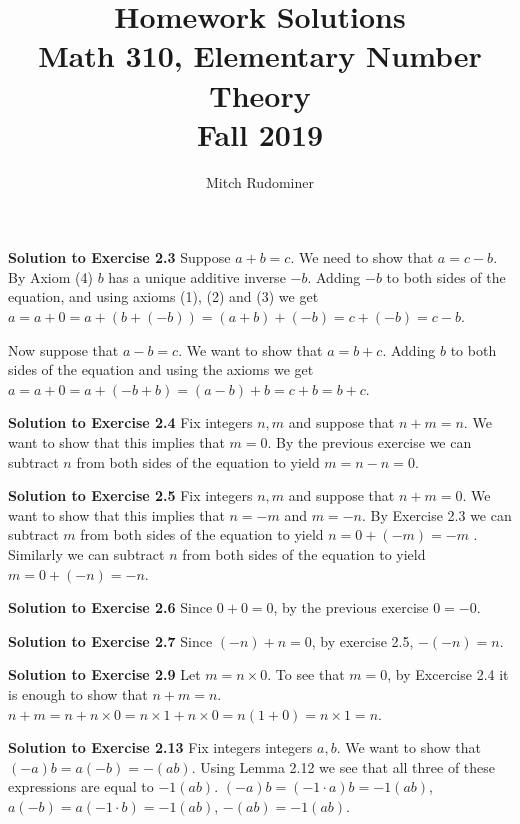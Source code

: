 \documentclass[oneside,12pt]{amsart}
\begin{document}
\title{Homework Solutions \\ Math 310, Elementary Number Theory \\ Fall 2019}
\author{Mitch Rudominer}

\maketitle

\textbf{Solution to Exercise 2.3} Suppose $a+b = c$. We need to show that $a=c-b$.
By Axiom (4) $b$ has a unique additive inverse $-b$. Adding $-b$
to both sides of the equation, and
using axioms (1), (2) and (3) we get
$a= a+0 = a + (b + (-b)) = (a+b) + (-b) = c + (-b) = c-b$.

Now suppose that $a-b = c$. We want to show that $a=b+c$.
Adding $b$ to both sides of the equation and using
the axioms we get
$a = a + 0 = a + (-b + b) = (a - b) +b  = c + b = b+c$.

\bigskip


\textbf{Solution to Exercise 2.4} Fix integers $n,m$ and suppose that $n+m=n$.
We want to show that this implies that $m=0$.
By the previous exercise we  can subtract $n$ from both sides of the equation
to yield $m = n - n = 0$.


\bigskip


\textbf{Solution to Exercise 2.5} Fix integers $n,m$ and suppose that $n+m=0$.
We want to show that this implies that $n=-m$ and $m=-n$.
By Exercise 2.3 we can subtract $m$ from both sides of the equation to yield
 $n = 0+ (-m) = -m$ . Similarly we can subtract $n$ from both sides of the
 equation to yield $m=0+(-n) = -n$.

\bigskip


\textbf{Solution to Exercise 2.6} Since $0+0 = 0$, by the previous exercise
$0=-0$.


\bigskip


\textbf{Solution to Exercise 2.7} Since $(-n) + n = 0$, by exercise 2.5,
$-(-n) = n$.

\bigskip


\textbf{Solution to Exercise 2.9} Let $m=n\times 0$. To see that $m=0$, by
Excercise 2.4 it is enough to show that $n+m=n$.
$n+m = n + n\times 0 = n\times 1 + n\times 0
= n (1 + 0) = n \times 1 = n$.


\bigskip


\textbf{Solution to Exercise 2.13} Fix integers integers $a, b$.
We want to show that $(-a)b = a(-b) = -(ab)$. Using Lemma 2.12
we see that all three of these expressions are equal to $-1(ab)$.
$(-a)b=(-1\cdot a)b = -1(ab)$, $a(-b)=a(-1\cdot b) = -1(ab)$,
$-(ab) = -1(ab)$.
\end{document}
